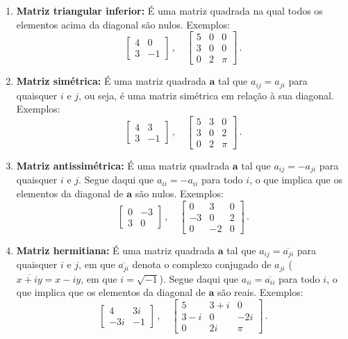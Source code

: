 \documentclass[12pt,a4paper]{report}
\newcommand{\tb}{\textbf}
\newcommand{\mb}{\mathbf}
\begin{document}
\begin{enumerate}
  \item \tb{Matriz triangular inferior:} É uma matriz quadrada na qual todos os elementos acima da diagonal são nulos. Exemplos:
  $$\begin{bmatrix}
    4&0\\
    3&-1
  \end{bmatrix}\,,\quad \begin{bmatrix}
    5&0&0\\
    3&0&0\\
    0&2&\pi
  \end{bmatrix}\,.$$
  \item \tb{Matriz simétrica:} É uma matriz quadrada $\mb{a}$ tal que $a_{ij}=a_{ji}$ para quaisquer $i$ e $j$, ou seja, é uma matriz simétrica em relação à sua diagonal. Exemplos:
  $$\begin{bmatrix}
    4&3\\
    3&-1
  \end{bmatrix}\,,\quad \begin{bmatrix}
    5&3&0\\
    3&0&2\\
    0&2&\pi
  \end{bmatrix}\,.$$
  \item \tb{Matriz antissimétrica:} É uma matriz quadrada $\mb{a}$ tal que $a_{ij}=-a_{ji}$ para quaisquer $i$ e $j$. Segue daqui que $a_{ii}=-a_{ii}$ para todo $i$, o que implica que os elementos da diagonal de $\mb a$ são nulos. Exemplos:
  $$\begin{bmatrix}
    0&-3\\
    3&0
  \end{bmatrix}\,,\quad \begin{bmatrix}
    0&3&0\\
    -3&0&2\\
    0&-2&0
  \end{bmatrix}\,.$$
  \item \tb{Matriz hermitiana:} É uma matriz quadrada $\mb a$ tal que $a_{ij}=\overline{a_{ji}}$ para quaisquer $i$ e $j$, em que $\overline{a_{ji}}$ denota o complexo conjugado de $a_{ji}$ ($\overline{x+iy}=x-iy$, em que $i=\sqrt{-1}$). Segue daqui que $a_{ii}=\overline{a_{ii}}$ para todo $i$, o que implica que os elementos da diagonal de $\mb a$ são reais. Exemplos:
  $$\begin{bmatrix}
    4&3i\\
    -3i&-1
  \end{bmatrix}\,,\quad \begin{bmatrix}
    5&3+i&0\\
    3-i&0&-2i\\
    0&2i&\pi
  \end{bmatrix}\,.$$
\end{enumerate}
\end{document}
